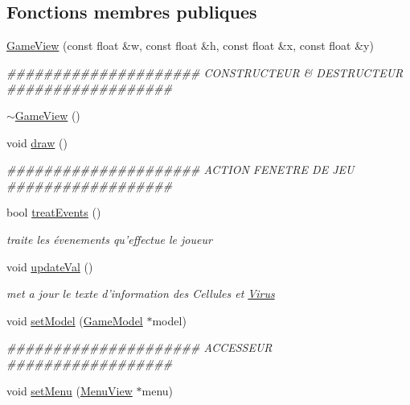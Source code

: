 \subsection*{Fonctions membres publiques}
\begin{DoxyCompactItemize}
\item 
\hyperlink{classGameView_aaf62abca99c18de0134273e83fbd12bf}{GameView} (const float \&w, const float \&h, const float \&x, const float \&y)
\begin{DoxyCompactList}\small\item\em \#\#\#\#\#\#\#\#\#\#\#\#\#\#\#\#\#\#\#\#\# CONSTRUCTEUR \& DESTRUCTEUR \#\#\#\#\#\#\#\#\#\#\#\#\#\#\#\#\#\# \end{DoxyCompactList}\item 
\hyperlink{classGameView_a957dca86bb68a729188f167f7d45ab86}{$\sim$GameView} ()
\item 
void \hyperlink{classGameView_a75af23797a7184e35425a93221dae9fa}{draw} ()
\begin{DoxyCompactList}\small\item\em \#\#\#\#\#\#\#\#\#\#\#\#\#\#\#\#\#\#\#\#\# ACTION FENETRE DE JEU \#\#\#\#\#\#\#\#\#\#\#\#\#\#\#\#\#\# \end{DoxyCompactList}\item 
bool \hyperlink{classGameView_a7a20bb5cfeb583a637013cb1846e37e8}{treatEvents} ()
\begin{DoxyCompactList}\small\item\em traite les évenements qu'effectue le joueur \end{DoxyCompactList}\item 
void \hyperlink{classGameView_afaf998667ba65daa7c4a51de5bb9f679}{updateVal} ()
\begin{DoxyCompactList}\small\item\em met a jour le texte d'information des Cellules et \hyperlink{classVirus}{Virus} \end{DoxyCompactList}\item 
void \hyperlink{classGameView_a08a03be946eac62d5bdd9cd0e8262857}{setModel} (\hyperlink{classGameModel}{GameModel} $\ast$model)
\begin{DoxyCompactList}\small\item\em \#\#\#\#\#\#\#\#\#\#\#\#\#\#\#\#\#\#\#\#\# ACCESSEUR \#\#\#\#\#\#\#\#\#\#\#\#\#\#\#\#\#\# \end{DoxyCompactList}\item 
void \hyperlink{classGameView_a2fdd158deb23c97d2aaeaa1c6590c476}{setMenu} (\hyperlink{classMenuView}{MenuView} $\ast$menu)
\end{DoxyCompactItemize}
